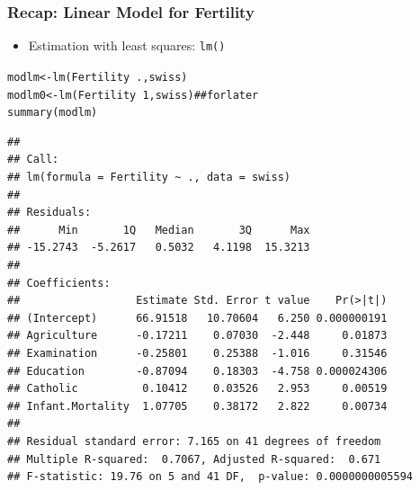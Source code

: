 \documentclass[extsize,handout,10pt]{beamer}\usepackage[]{graphicx}\usepackage[]{color}
\makeatletter
\newcommand{\hlnum}[1]{\textcolor[rgb]{0.502,0.086,1}{#1}}%
\newcommand{\hlcom}[1]{\textcolor[rgb]{1,0.251,0.502}{#1}}%
\newcommand{\hlopt}[1]{\textcolor[rgb]{0.251,0.251,0.251}{#1}}%
\newcommand{\hlstd}[1]{\textcolor[rgb]{0.251,0.251,0.251}{#1}}%
\newcommand{\hlkwb}[1]{\textcolor[rgb]{0,0.439,0.902}{#1}}%
\newcommand{\hlkwd}[1]{\textcolor[rgb]{0.69,0.188,0.941}{#1}}%
\newenvironment{kframe}{%
 \def\at@end@of@kframe{}%
 \ifinner\ifhmode%
  \def\at@end@of@kframe{\end{minipage}}%
  \begin{minipage}{\columnwidth}%
 \fi\fi%
 \def\FrameCommand##1{\hskip\@totalleftmargin \hskip-\fboxsep
 \colorbox{shadecolor}{##1}\hskip-\fboxsep
     \hskip-\linewidth \hskip-\@totalleftmargin \hskip\columnwidth}%
 \MakeFramed {\advance\hsize-\width
   \@totalleftmargin\z@ \linewidth\hsize
   \@setminipage}}%
 {\par\unskip\endMakeFramed%
 \at@end@of@kframe}
\newenvironment{knitrout}{}{} %
\makeatother
\begin{document}
\begin{frame}[fragile]
  \frametitle{Recap: Linear Model for Fertility}
  \begin{itemize}
  \item Estimation with least squares:  \texttt{lm()} 
  \end{itemize}

\begin{knitrout}\tiny
{}\color{fgcolor}\begin{kframe}
\begin{alltt}
\hlstd{modlm}\hlkwb{<-}\hlkwd{lm}\hlstd{(Fertility}\hlopt{~}\hlstd{.,swiss)}
\hlstd{modlm0}\hlkwb{<-}\hlkwd{lm}\hlstd{(Fertility}\hlopt{~}\hlnum{1}\hlstd{,swiss)} \hlcom{##for later}
\hlkwd{summary}\hlstd{(modlm)}
\end{alltt}
\begin{verbatim}
## 
## Call:
## lm(formula = Fertility ~ ., data = swiss)
## 
## Residuals:
##      Min       1Q   Median       3Q      Max 
## -15.2743  -5.2617   0.5032   4.1198  15.3213 
## 
## Coefficients:
##                  Estimate Std. Error t value    Pr(>|t|)
## (Intercept)      66.91518   10.70604   6.250 0.000000191
## Agriculture      -0.17211    0.07030  -2.448     0.01873
## Examination      -0.25801    0.25388  -1.016     0.31546
## Education        -0.87094    0.18303  -4.758 0.000024306
## Catholic          0.10412    0.03526   2.953     0.00519
## Infant.Mortality  1.07705    0.38172   2.822     0.00734
## 
## Residual standard error: 7.165 on 41 degrees of freedom
## Multiple R-squared:  0.7067,	Adjusted R-squared:  0.671 
## F-statistic: 19.76 on 5 and 41 DF,  p-value: 0.0000000005594
\end{verbatim}
\end{kframe}
\end{knitrout}
\end{frame}
\end{document}
